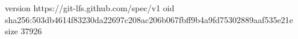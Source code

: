 version https://git-lfs.github.com/spec/v1
oid sha256:503db4614f83230da22697c208ac206b067fbff9b4a9fd75302889aaf535e21e
size 37926
